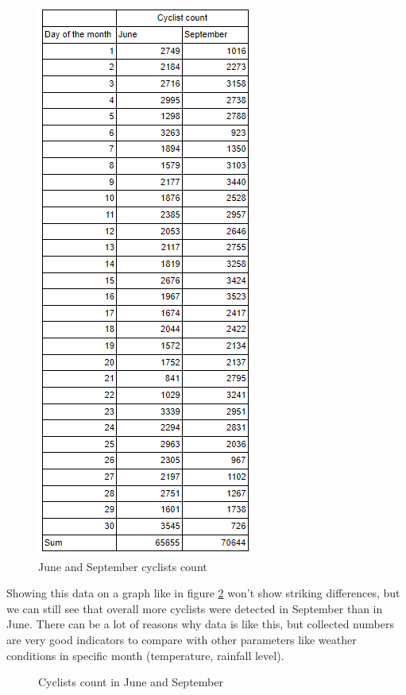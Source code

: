 \begin{figure}
    \centering
    \includegraphics{images/tableJS}
    \caption{June and September cyclists count}
    \label{fig:j-s}
\end{figure}
Showing this data on a graph like in figure \ref{fig:j-s2} won't show striking differences, but we can still see that overall more cyclists were detected in September than in June. There can be a lot of reasons why data is like this, but collected numbers are very good indicators to compare with other parameters like weather conditions in specific month (temperature, rainfall level).
\begin{figure}
    \centering
    \caption{Cyclists count in June and September}
    \label{fig:j-s2}
\end{figure}